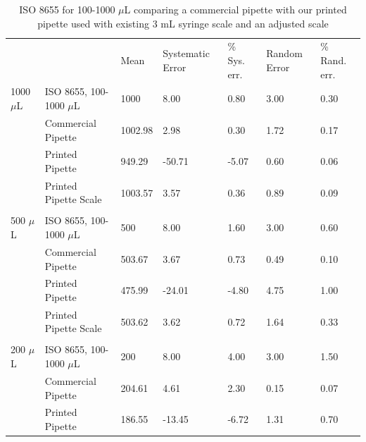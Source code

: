 \documentclass[10pt,letterpaper]{article}
\begin{document}
\begin{table}[!ht]
	\begin{adjustwidth}{-2.25in}{0in} %
		\centering
		\caption{ISO 8655 for 100-1000 $\mu$L comparing a commercial pipette with our printed pipette used with existing 3 mL syringe scale and an adjusted scale}
		\label{table3}
		\begin{tabular}{lllllll}
			&                       & Mean   & Systematic Error & \% Sys. err. & Random Error & \% Rand. err. \\
			1000 $\mu$L & ISO 8655, 100-1000 $\mu$L & 1000    & 8.00             & 0.80         & 3.00         & 0.30          \\
			& Commercial Pipette    & 1002.98 & 2.98             & 0.30         & 1.72         & 0.17          \\
			& Printed Pipette       & 949.29  & -50.71           & -5.07        & 0.60         & 0.06          \\
			& Printed Pipette Scale & 1003.57 & 3.57             & 0.36         & 0.89         & 0.09          \\
			&                       &         &                  &              &              &               \\
			500 $\mu$L  & ISO 8655, 100-1000 $\mu$L & 500     & 8.00             & 1.60         & 3.00         & 0.60          \\
			& Commercial Pipette    & 503.67  & 3.67             & 0.73         & 0.49         & 0.10          \\
			& Printed Pipette       & 475.99  & -24.01           & -4.80        & 4.75         & 1.00          \\
			& Printed Pipette Scale & 503.62  & 3.62             & 0.72         & 1.64         & 0.33          \\
			&                       &         &                  &              &              &               \\
			200 $\mu$L  & ISO 8655, 100-1000 $\mu$L & 200     & 8.00             & 4.00         & 3.00         & 1.50          \\
			& Commercial Pipette    & 204.61  & 4.61             & 2.30         & 0.15         & 0.07          \\
			& Printed Pipette       & 186.55  & -13.45           & -6.72        & 1.31         & 0.70          \\

\end{tabular}
\end{adjustwidth}
\end{table}
\end{document}
